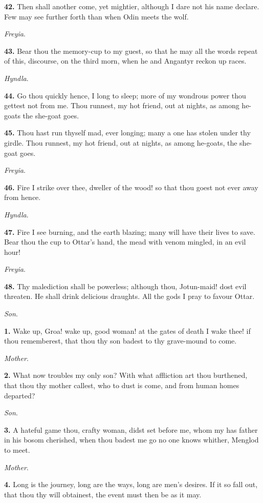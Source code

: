 \textbf{42.} Then shall another come, yet mightier, although I dare not his
name declare. Few may see further forth than when Odin meets the wolf.

\emph{Freyia}.

\textbf{43.} Bear thou the memory-cup to my guest, so that he may all the
words repeat of this, discourse, on the third morn, when he and
Angantyr reckon up races.

\emph{Hyndla}.

\textbf{44.} Go thou quickly hence, I long to sleep; more of my wondrous
power thou gettest not from me. Thou runnest, my hot friend, out at
nights, as among he-goats the she-goat goes.

\textbf{45.} Thou hast run thyself mad, ever longing; many a one has stolen
under thy girdle. Thou runnest, my hot friend, out at nights, as among
he-goats, the she-goat goes.

\emph{Freyia}.

\textbf{46.} Fire I strike over thee, dweller of the wood! so that thou goest
not ever away from hence.

\emph{Hyndla}.

\textbf{47.} Fire I see burning, and the earth blazing; many will have their
lives to save. Bear thou the cup to Ottar's hand, the mead with venom
mingled, in an evil hour!

\emph{Freyia}.

\textbf{48.} Thy malediction shall be powerless; although thou, Jotun-maid!
dost evil threaten. He shall drink delicious draughts. All the gods I
pray to favour Ottar.


\emph{Son}.

\textbf{1.} Wake up, Groa! wake up, good woman! at the gates of death I wake
thee! if thou rememberest, that thou thy son badest to thy grave-mound
to come.

\emph{Mother}.

\textbf{2.} What now troubles my only son? With what affliction art thou
burthened, that thou thy mother callest, who to dust is come, and from
human homes departed?

\emph{Son}.

\textbf{3.} A hateful game thou, crafty woman, didst set before me, whom my
has father in his bosom cherished, when thou badest me go no one knows
whither, Menglod to meet.

\emph{Mother}.

\textbf{4.} Long is the journey, long are the ways, long are men's desires.
If it so fall out, that thou thy will obtainest, the event must then
be as it may.

